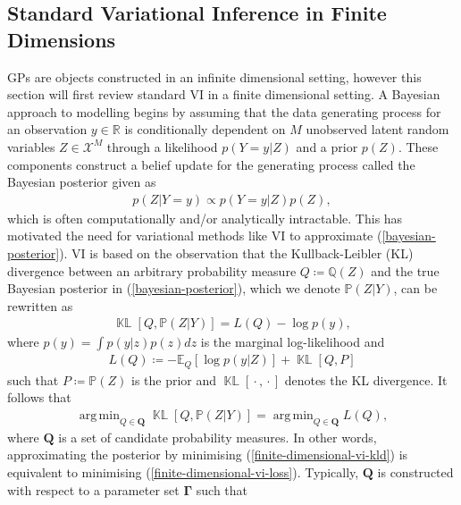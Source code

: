 \documentclass{article}
\newcommand{\KLD}{\operatorname{\mathbb{KL}}}
\newcommand{\wc}{\operatorname{{}\cdot{}}}
\DeclareMathOperator*{\argmin}{arg\,min}
\numberwithin{equation}{section}
\begin{document}
\subsection{Standard Variational Inference in Finite Dimensions}\label{section:vi-in-finite-dimensions}
GPs are objects constructed in an infinite dimensional setting, however this section will first review standard VI in a finite dimensional setting.
A Bayesian approach to modelling begins by assuming that the data generating process for an observation $y \in \mathbb{R}$ is conditionally dependent on $M$ unobserved latent random variables $Z \in \mathcal{X}^M$ through a likelihood $p(Y=y\vert Z)$ and a prior $p(Z)$.
These components construct a belief update for the generating process called the Bayesian posterior given as
\begin{align}
    p(Z \vert Y=y) \propto p(Y=y\vert Z)p(Z),
    \label{bayesian-posterior}
\end{align}
which is often computationally and/or analytically intractable.
This has motivated the need for variational methods like VI to approximate (\ref{bayesian-posterior}).
VI is based on the observation that the Kullback-Leibler (KL) divergence between an arbitrary probability measure $Q \coloneqq \mathbb{Q}(Z)$ and the true Bayesian posterior in (\ref{bayesian-posterior}), which we denote $\mathbb{P}(Z\vert Y)$, can be rewritten as
\begin{align}
    \KLD\left[Q, \mathbb{P}(Z \vert Y)\right] = L(Q) - \log p(y),
    \label{finite-dimensional-vi-kld}
\end{align}
where $p(y) = \int p(y\vert z)p(z) dz$ is the marginal log-likelihood and
\begin{align}
    L(Q) \coloneqq -\mathbb{E}_{Q}\left[\log p(y \vert Z)\right] + \KLD\left[Q, P\right]
    \label{finite-dimensional-vi-loss}
\end{align}
such that $P \coloneqq \mathbb{P}(Z)$ is the prior and $\KLD\left[\wc, \wc\right]$ denotes the KL divergence.
It follows that
\begin{align}
    \argmin_{Q \in \boldsymbol{Q}} \KLD\left[Q, \mathbb{P}(Z\vert Y)\right] = \argmin_{Q \in \boldsymbol{Q}} L(Q),
    \label{optimal-approximation-vi}
\end{align}
where $\boldsymbol{Q}$ is a set of candidate probability measures.
In other words, approximating the posterior by minimising (\ref{finite-dimensional-vi-kld}) is equivalent to minimising (\ref{finite-dimensional-vi-loss}). Typically, $\boldsymbol{Q}$ is constructed with respect to a parameter set $\boldsymbol{\Gamma}$ such that
\end{document}
